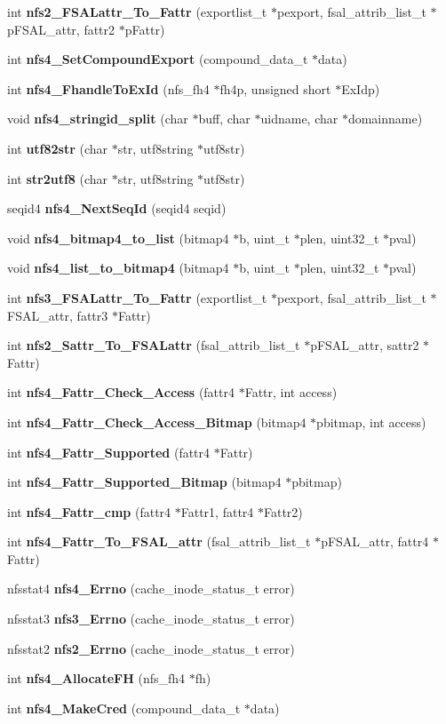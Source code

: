 \begin{CompactItemize}
int {\bf nfs2\_\-FSALattr\_\-To\_\-Fattr} (exportlist\_\-t $\ast$pexport, fsal\_\-attrib\_\-list\_\-t $\ast$p\-FSAL\_\-attr, fattr2 $\ast$p\-Fattr)
\item 
int {\bf nfs4\_\-Set\-Compound\-Export} (compound\_\-data\_\-t $\ast$data)
\item 
int {\bf nfs4\_\-Fhandle\-To\-Ex\-Id} (nfs\_\-fh4 $\ast$fh4p, unsigned short $\ast$Ex\-Idp)
\item 
void {\bf nfs4\_\-stringid\_\-split} (char $\ast$buff, char $\ast$uidname, char $\ast$domainname)
\item 
int {\bf utf82str} (char $\ast$str, utf8string $\ast$utf8str)
\item 
int {\bf str2utf8} (char $\ast$str, utf8string $\ast$utf8str)
\item 
seqid4 {\bf nfs4\_\-Next\-Seq\-Id} (seqid4 seqid)
\item 
void {\bf nfs4\_\-bitmap4\_\-to\_\-list} (bitmap4 $\ast$b, uint\_\-t $\ast$plen, uint32\_\-t $\ast$pval)
\item 
void {\bf nfs4\_\-list\_\-to\_\-bitmap4} (bitmap4 $\ast$b, uint\_\-t $\ast$plen, uint32\_\-t $\ast$pval)
\item 
int {\bf nfs3\_\-FSALattr\_\-To\_\-Fattr} (exportlist\_\-t $\ast$pexport, fsal\_\-attrib\_\-list\_\-t $\ast$FSAL\_\-attr, fattr3 $\ast$Fattr)
\item 
int {\bf nfs2\_\-Sattr\_\-To\_\-FSALattr} (fsal\_\-attrib\_\-list\_\-t $\ast$p\-FSAL\_\-attr, sattr2 $\ast$Fattr)
\item 
int {\bf nfs4\_\-Fattr\_\-Check\_\-Access} (fattr4 $\ast$Fattr, int access)
\item 
int {\bf nfs4\_\-Fattr\_\-Check\_\-Access\_\-Bitmap} (bitmap4 $\ast$pbitmap, int access)
\item 
int {\bf nfs4\_\-Fattr\_\-Supported} (fattr4 $\ast$Fattr)
\item 
int {\bf nfs4\_\-Fattr\_\-Supported\_\-Bitmap} (bitmap4 $\ast$pbitmap)
\item 
int {\bf nfs4\_\-Fattr\_\-cmp} (fattr4 $\ast$Fattr1, fattr4 $\ast$Fattr2)
\item 
int {\bf nfs4\_\-Fattr\_\-To\_\-FSAL\_\-attr} (fsal\_\-attrib\_\-list\_\-t $\ast$p\-FSAL\_\-attr, fattr4 $\ast$Fattr)
\item 
nfsstat4 {\bf nfs4\_\-Errno} (cache\_\-inode\_\-status\_\-t error)
\item 
nfsstat3 {\bf nfs3\_\-Errno} (cache\_\-inode\_\-status\_\-t error)
\item 
nfsstat2 {\bf nfs2\_\-Errno} (cache\_\-inode\_\-status\_\-t error)
\item 
int {\bf nfs4\_\-Allocate\-FH} (nfs\_\-fh4 $\ast$fh)
\item 
int {\bf nfs4\_\-Make\-Cred} (compound\_\-data\_\-t $\ast$data)
\end{CompactItemize}

